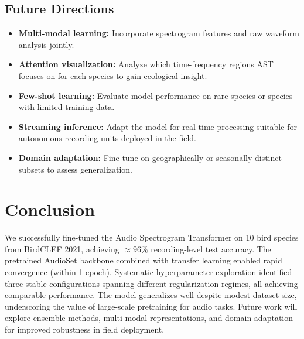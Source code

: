 \documentclass[11pt, a4paper]{article}
\begin{document}
\subsection{Future Directions}
\begin{itemize}
  \item \textbf{Multi-modal learning:} Incorporate spectrogram features and raw waveform analysis jointly.
  \item \textbf{Attention visualization:} Analyze which time-frequency regions AST focuses on for each species to gain ecological insight.
  \item \textbf{Few-shot learning:} Evaluate model performance on rare species or species with limited training data.
  \item \textbf{Streaming inference:} Adapt the model for real-time processing suitable for autonomous recording units deployed in the field.
  \item \textbf{Domain adaptation:} Fine-tune on geographically or seasonally distinct subsets to assess generalization.
\end{itemize}

\section{Conclusion}

We successfully fine-tuned the Audio Spectrogram Transformer on 10 bird species from BirdCLEF 2021, achieving $\approx 96\%$ recording-level test accuracy. The pretrained AudioSet backbone combined with transfer learning enabled rapid convergence (within 1 epoch). Systematic hyperparameter exploration identified three stable configurations spanning different regularization regimes, all achieving comparable performance. The model generalizes well despite modest dataset size, underscoring the value of large-scale pretraining for audio tasks. Future work will explore ensemble methods, multi-modal representations, and domain adaptation for improved robustness in field deployment.
\end{document}
